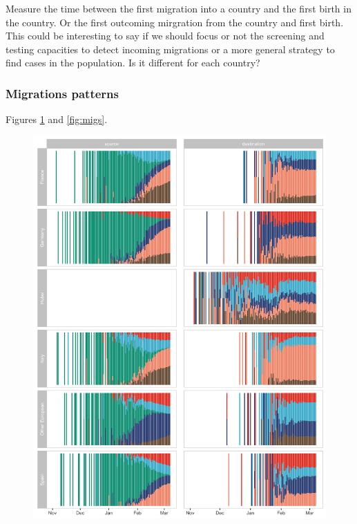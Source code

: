 \documentclass[12pt,]{article}
\begin{document}
 Measure the time between the first migration into a country and the first birth in the country. Or the first outcoming mirgration from the country and first birth. This could be interesting to say if we should focus or not the screening and testing capacities to detect incoming migrations or a more general strategy to find cases in the population. Is it different for each country?\\


\subsubsection*{Migrations patterns}
Figures \ref{fig:migs_srcdest} and \ref{fig:migs}.\\



\begin{figure}[ht]
    \centering
    \includegraphics[width=\textwidth]{201014_europe2_figtraj07.png}
    \caption{}
    \label{fig:migs_srcdest}
\end{figure}
\end{document}
